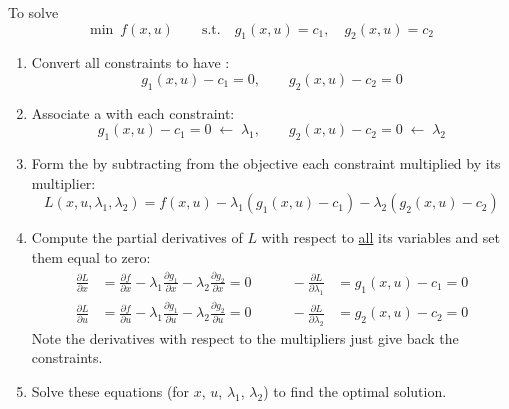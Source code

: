 To solve
\[\min\ f(x,u) \qquad \text{s.t.}\quad g_1(x,u) = c_1, \quad g_2(x,u) = c_2\]
\begin{enumerate}[label=\textcolor{red!70!black}{\textbf{Step \arabic*:}}, leftmargin=*]
    \item Convert all constraints to have :
    \[g_1(x,u) - c_1 = 0, \qquad g_2(x,u) - c_2 = 0\]
    \item Associate a  with each constraint:
    \[g_1(x,u) - c_1 = 0 \;\longleftarrow\; \lambda_1, \qquad g_2(x,u) - c_2 = 0 \;\longleftarrow\; \lambda_2\]
    \item Form the  by subtracting from the objective each constraint multiplied by its multiplier:
    \[\boxed{L(x,u,\lambda_1,\lambda_2) = f(x,u) - \lambda_1\left(g_1(x,u) - c_1\right) - \lambda_2\left(g_2(x,u) - c_2\right)}\]
    \item Compute the partial derivatives of $L$ with respect to \ul{all} its variables and set them equal to zero:
    \[\begin{aligned}
        \frac{\partial L}{\partial x} &= \frac{\partial f}{\partial x} - \lambda_1\frac{\partial g_1}{\partial x} - \lambda_2\frac{\partial g_2}{\partial x} = 0 & \qquad -\frac{\partial L}{\partial \lambda_1} &= g_1(x,u) - c_1 = 0\\
        \frac{\partial L}{\partial u} &= \frac{\partial f}{\partial u} - \lambda_1\frac{\partial g_1}{\partial u} - \lambda_2\frac{\partial g_2}{\partial u} = 0 & \qquad -\frac{\partial L}{\partial \lambda_2} &= g_2(x,u) - c_2 = 0
    \end{aligned}\]
    Note the derivatives with respect to the multipliers just give back the constraints.
    \item Solve these equations (for $x$, $u$, $\lambda_1$, $\lambda_2$) to find the optimal solution.
\end{enumerate}

